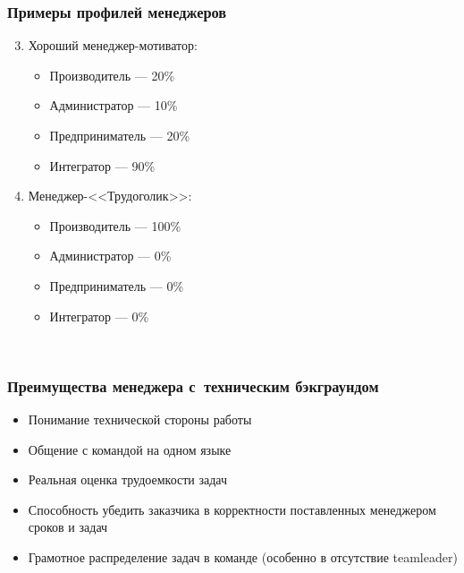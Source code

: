 \documentclass{../industrial-development}
\begin{document}
{{{{{{{{{{{{{{{\begin{frame} \frametitle{Примеры профилей менеджеров }
	\begin{enumerate}
\setcounter{enumi}{2}
\item Хороший менеджер-мотиватор:
		 \begin{itemize}
                     \item Производитель — 20\%
 		 \item Администратор — 10\%
 		 \item Предприниматель — 20\%
		\item Интегратор — 90\%
		\end{itemize} 
\item Менеджер-<<Трудоголик>>:	
		 \begin{itemize}
                         \item Производитель — 100\%
 		 \item Администратор — 0\%
 		 \item Предприниматель — 0\%
		\item Интегратор — 0\%
		\end{itemize} 
\end{enumerate}
\end{frame}
\lecturenotes
~\cite{How_to_be_a_good_IT-manager}

\begin{frame} \frametitle{Преимущества менеджера с~техническим бэкграундом}
	 \begin{itemize}
                      \item Понимание технической стороны работы
		\item Общение с командой на одном языке
		\item Реальная оценка трудоемкости задач
		\item Способность убедить заказчика в корректности поставленных менеджером сроков и задач
		\item Грамотное распределение задач в команде (особенно в отсутствие teamleader)
	\end{itemize} 	
\end{frame}
\lecturenotes

~\cite{How_to_be_a_good_IT-manager}

}}}}}}}}}}}}}}}
\end{document}
